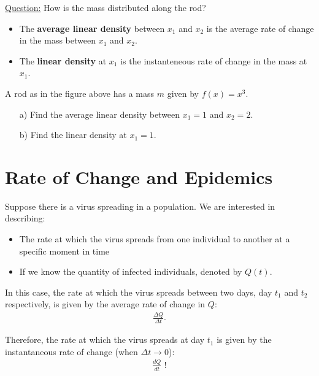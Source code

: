 \documentclass[12pt,a4paper]{article}
\newcommand{\ra}{\rightarrow}
\newcounter{example}[section]
\begin{document}
	\underline{Question:} How is the mass distributed along the rod?
	
	\begin{itemize}
	\item The \textbf{average linear density} between $x_1$ and $x_2$ is the average rate of change in the mass between $x_1$ and $x_2$.
	\item The \textbf{linear density} at $x_1$ is the instanteneous rate of change in the mass at $x_1$.
	\end{itemize}
	
	\vspace*{16pt}
	
	\begin{example}
	A rod as in the figure above has a mass $m$ given by $f(x) = x^3$.
		\begin{enumerate}
		\item[a)] Find the average linear density between $x_1 = 1$ and $x_2 = 2$.
		\item[b)] Find the linear density at $x_1 = 1$.
		\end{enumerate}
	\end{example}
	
	
\newpage

\section{Rate of Change and Epidemics}
Suppose there is a virus spreading in a population. We are interested in describing:
	\begin{itemize}
	\item The rate at which the virus spreads from one individual to another at a specific moment in time
	\item If we know the quantity of infected individuals, denoted by $Q(t)$.
	\end{itemize}
	
In this case, the rate at which the virus spreads between two days, day $t_1$ and $t_2$ respectively, is given by the average rate of change in $Q$:
	\begin{align*}
	\frac{\Delta Q}{\Delta t} .
	\end{align*}

Therefore, the rate at which the virus spreads at day $t_1$ is given by the instantaneous rate of change (when $\Delta t \ra 0$):
	\begin{align*}
	\frac{dQ}{dt} \text{ !}
	\end{align*}
	
\end{document}

